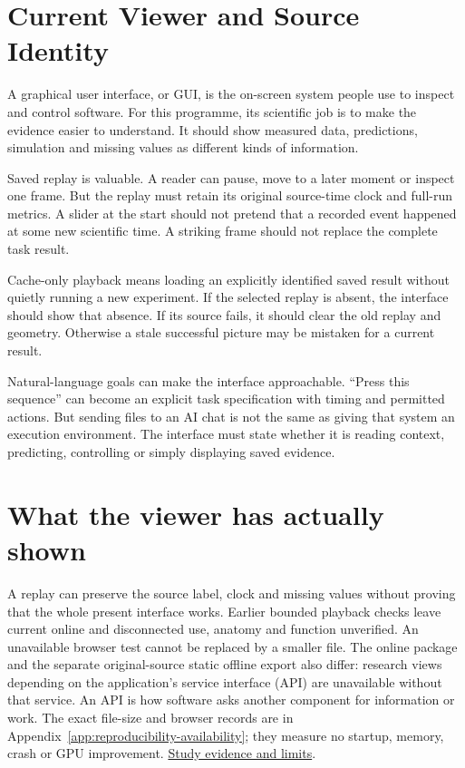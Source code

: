 \section{Current Viewer and Source Identity}

A graphical user interface, or GUI, is the on-screen system people use to inspect and control software. For this programme, its scientific job is to make the evidence easier to understand. It should show measured data, predictions, simulation and missing values as different kinds of information.\par

Saved replay is valuable. A reader can pause, move to a later moment or inspect one frame. But the replay must retain its original source-time clock and full-run metrics. A slider at the start should not pretend that a recorded event happened at some new scientific time. A striking frame should not replace the complete task result.\par

Cache-only playback means loading an explicitly identified saved result without quietly running a new experiment. If the selected replay is absent, the interface should show that absence. If its source fails, it should clear the old replay and geometry. Otherwise a stale successful picture may be mistaken for a current result.\par

Natural-language goals can make the interface approachable. ``Press this sequence'' can become an explicit task specification with timing and permitted actions. But sending files to an AI chat is not the same as giving that system an execution environment. The interface must state whether it is reading context, predicting, controlling or simply displaying saved evidence.\par



\section{What the viewer has actually shown}

A replay can preserve the source label, clock and missing values without proving that the whole present interface works. Earlier bounded playback checks leave current online and disconnected use, anatomy and function unverified. An unavailable browser test cannot be replaced by a smaller file. The online package and the separate original-source static offline export also differ: research views depending on the application's service interface (API) are unavailable without that service. An API is how software asks another component for information or work. The exact file-size and browser records are in Appendix~\ref{app:reproducibility-availability}; they measure no startup, memory, crash or GPU improvement. \href{research-evidence.json}{Study evidence and limits}.\par

